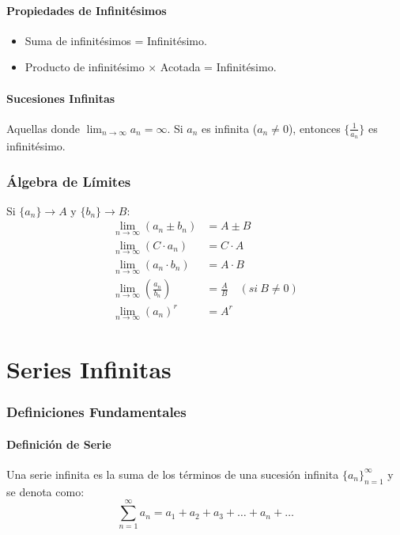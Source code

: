\documentclass[a4paper,12pt]{article}
\begin{document}
\subsection{Propiedades de Infinitésimos}
\begin{itemize}
    \item Suma de infinitésimos = Infinitésimo.
    \item Producto de infinitésimo $\times$ Acotada = Infinitésimo.
\end{itemize}

\subsection{Sucesiones Infinitas}
Aquellas donde $\lim_{n \to \infty} a_n = \infty$. Si $a_n$ es infinita ($a_n \neq 0$), entonces $\{\frac{1}{a_n}\}$ es infinitésimo.

\section{Álgebra de Límites}
Si $\{a_n\} \to A$ y $\{b_n\} \to B$:
\begin{align*}
    \lim_{n \to \infty} (a_n \pm b_n) &= A \pm B \\
    \lim_{n \to \infty} (C \cdot a_n) &= C \cdot A \\
    \lim_{n \to \infty} (a_n \cdot b_n) &= A \cdot B \\
    \lim_{n \to \infty} \left(\frac{a_n}{b_n}\right) &= \frac{A}{B} \quad (si \ B \neq 0) \\
    \lim_{n \to \infty} (a_n)^r &= A^r
\end{align*}

\newpage

\part{Series Infinitas}

\section{Definiciones Fundamentales}

\subsection{Definición de Serie}
Una serie infinita es la suma de los términos de una sucesión infinita $\{a_n\}_{n=1}^{\infty}$ y se denota como:
$$\sum_{n=1}^{\infty} a_n = a_1 + a_2 + a_3 + \dots + a_n + \dots$$
\end{document}
